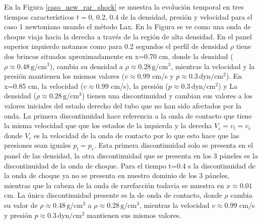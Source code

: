 \documentclass[12pt,a4paper]{book}
\begin{document}
En la Figura \ref{caso_new_rar_shock} se muestra la evolución temporal en tres 
tiempos característicos $t = 0, \, 0.2, \, 0.4$
de la densidad, 
presión y velocidad para el caso 1 newtoniano usando el método Lax. En la Figura se ve como 
una onda de choque viaja hacia la derecha a través de la región de alta densidad.
En el panel superior izquierdo
notamos como para 0.2 segundos el perfil de densidad $\rho$ tiene dos brincos situados 
aproximadamente en 
x=0.70 cm, donde la densidad ($\rho \approx 0.48 \,  \text{g}/ \text{cm}^3$), 
cambia su densidad a $\rho \approx 0.28 \,  \text{g}/ \text{cm}^3$, mientras la velocidad y la presión 
mantienen los mismos valores 
($v \approx 0.99$ cm/s y $p \approx 0.3 \,  \text{dyn}/ \text{cm}^2 $).
En x=0.85 cm, la velocidad ($v \approx 0.99$ cm/s), la presión 
($p \approx 0.3  \,  \text{dyn}/ \text{cm}^2 $)  y La densidad 
($\rho \approx 0.28 \,  \text{g}/ \text{cm}^3$) 
tienen una discontinuidad y cambian sus valores a los valores iniciales del estado derecho del tubo
que no han sido afectados por la onda. 
La primera discontinuidad hace referencia a la onda de contacto que tiene la misma velocidad
que que los estados de la izquierda y la derecha $V_c = v_l = v_r$ donde $V_c$
es la velocidad de la onda de contacto por lo que esto hace que las presiones sean iguales 
$p_l = p_r$. Esta primera discontinuidad solo se 
presenta en el panel de las densidad, la otra discontinuidad que se presenta en los 3 páneles es la 
discontinuidad de la onda de choque.
Para el tiempo t=0.4 s
la discontinuidad de la onda de choque ya no se presenta en nuestro dominio de los 3 páneles, mientras 
que la cabeza de la onda de rarefacción todavia se muestra en $x \approx 0.01$ cm. La única discontinuidad 
presente es la de onda de 
contacto, donde $\rho$ cambia su valor de $\rho \approx 0.48 \,  \text{g}/ \text{cm}^3$
a $\rho \approx 0.28 \,  \text{g}/ \text{cm}^3$, mientras la velocidad $v \approx 0.99$ cm/s y 
presión $p \approx 0.3 \,  \text{dyn}/ \text{cm}^2 $ mantienen
sus mismos valores.
\end{document}
